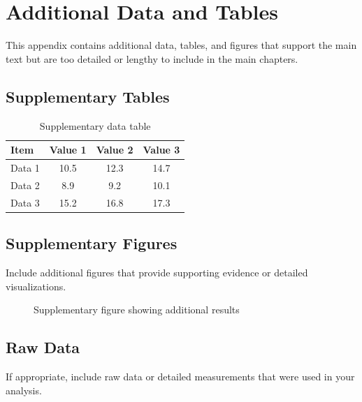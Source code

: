 
\chapter{Additional Data and Tables}
\label{appendix_a}


This appendix contains additional data, tables, and figures that support the main text but are too detailed or lengthy to include in the main chapters.

\section{Supplementary Tables}

\begin{table}[h]
\centering
\caption{Supplementary data table}
\label{tab:appendix_data}
\begin{tabular}{|l|c|c|c|}
\hline
\textbf{Item} & \textbf{Value 1} & \textbf{Value 2} & \textbf{Value 3} \\
\hline
Data 1 & 10.5 & 12.3 & 14.7 \\
Data 2 & 8.9 & 9.2 & 10.1 \\
Data 3 & 15.2 & 16.8 & 17.3 \\
\hline
\end{tabular}
\end{table}

\section{Supplementary Figures}

Include additional figures that provide supporting evidence or detailed visualizations.

\begin{figure}[h]
    \centering
    \caption{Supplementary figure showing additional results}
    \label{fig:appendix_figure}
\end{figure}

\section{Raw Data}

If appropriate, include raw data or detailed measurements that were used in your analysis.
